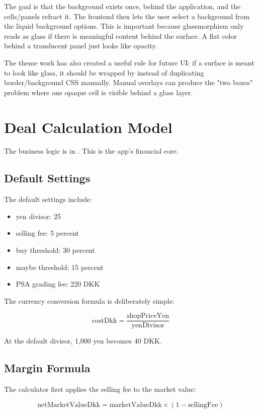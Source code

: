 \documentclass[11pt,a4paper]{article}
\begin{document}
The goal is that the background exists once, behind the application, and the cells/panels refract it. The frontend then lets the user select a background from the liquid background options. This is important because glassmorphism only reads as glass if there is meaningful content behind the surface. A flat color behind a translucent panel just looks like opacity.

The theme work has also created a useful rule for future UI: if a surface is meant to look like glass, it should be wrapped by  instead of duplicating border/background CSS manually. Manual overlays can produce the "two boxes" problem where one opaque cell is visible behind a glass layer.

\section{Deal Calculation Model}

The business logic is in . This is the app's financial core.

\subsection{Default Settings}

The default settings include:

\begin{itemize}
  \item yen divisor: 25
  \item selling fee: 5 percent
  \item buy threshold: 30 percent
  \item maybe threshold: 15 percent
  \item PSA grading fee: 220 DKK
\end{itemize}

The currency conversion formula is deliberately simple:

\[
\text{costDkk} = \frac{\text{shopPriceYen}}{\text{yenDivisor}}
\]

At the default divisor, 1,000 yen becomes 40 DKK.

\subsection{Margin Formula}

The calculator first applies the selling fee to the market value:

\[
\text{netMarketValueDkk} = \text{marketValueDkk} \times (1 - \text{sellingFee})
\]
\end{document}
